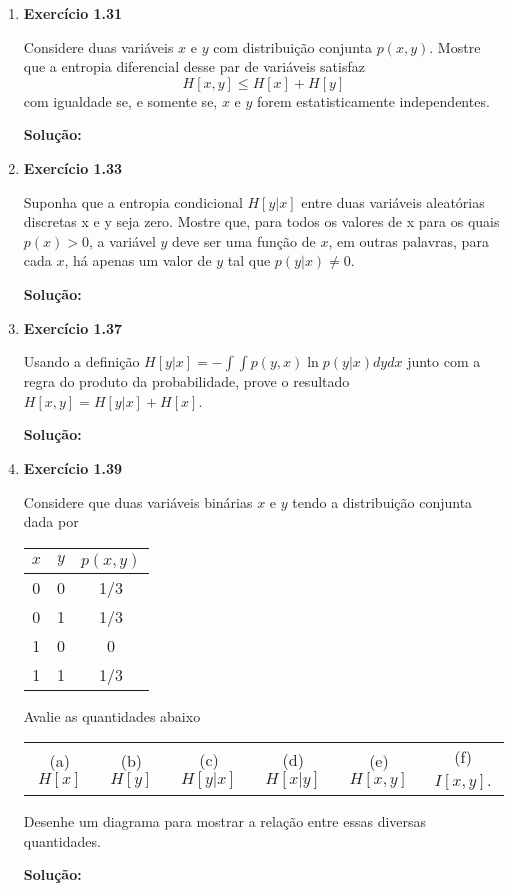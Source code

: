 \begin{enumerate}
\item \textbf{Exercício 1.31} \par

Considere duas variáveis $x$ e $y$ com distribuição conjunta $p(x, y)$. Mostre que a entropia diferencial desse par de variáveis satisfaz
\begin{equation*}
    H[x,y] \leq H[x] + H[y]
\end{equation*}
com igualdade se, e somente se, $x$ e $y$ forem estatisticamente independentes.
\newline \par
\textbf{Solução:}

\item \textbf{Exercício 1.33} \par

Suponha que a entropia condicional $H[y|x]$ entre duas variáveis aleatórias discretas x e y seja zero. Mostre que, para todos os valores de x para os quais $p(x) > 0$, a variável $y$ deve ser uma função de $x$, em outras palavras, para cada $x$, há apenas um valor de $y$ tal que $p(y|x) \neq 0$.
\newline \par
\textbf{Solução:}

\item \textbf{Exercício 1.37} \par

Usando a definição $H[y|x] = - \int \int p(y,x) \ln p(y|x) dy dx$ junto com a regra do produto da probabilidade, prove o resultado $H[x,y] = H[y|x] + H[x]$. 
\newline \par
\textbf{Solução:}

\item \textbf{Exercício 1.39} \par

Considere que duas variáveis binárias $x$ e $y$ tendo a distribuição conjunta dada por
\begin{center}
    \begin{tabular}{|c|c|c|}
    \hline
    $x$ & $y$ & $p(x, y)$ \\
    \hline
    0 & 0 & 1/3\\
    \hline
    0 & 1 & 1/3\\
    \hline
    1 & 0 & 0\\
    \hline
    1 & 1 & 1/3\\
    \hline
    \end{tabular}
\end{center}
Avalie as quantidades abaixo
\begin{center}
    \begin{tabular}{c c c c c c}
     (a)$H[x]$ & (b)$H[y]$ & (c)$H[y|x]$ & (d)$H[x|y]$ & (e)$H[x,y]$ & (f)$I[x,y]$. \\
    \end{tabular}
\end{center}
Desenhe um diagrama para mostrar a relação entre essas diversas quantidades.
\newline \par
\textbf{Solução:}


\end{enumerate}
